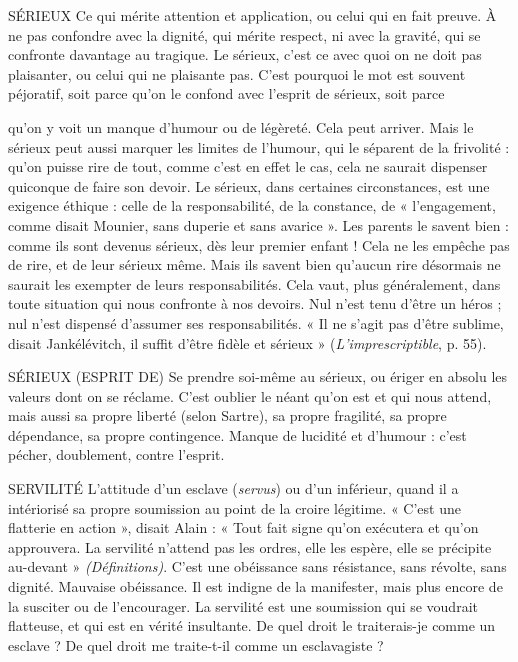 SÉRIEUX Ce qui mérite attention et application, ou celui qui en fait preuve.
À ne pas confondre avec la dignité, qui mérite respect, ni avec la
gravité, qui se confronte davantage au tragique. Le sérieux, c'est ce avec quoi on
ne doit pas plaisanter, ou celui qui ne plaisante pas. C’est pourquoi le mot est
souvent péjoratif, soit parce qu’on le confond avec l’esprit de sérieux, soit parce

qu'on y voit un manque d’humour ou de légèreté. Cela peut arriver. Mais le
sérieux peut aussi marquer les limites de l'humour, qui le séparent de la
frivolité : qu’on puisse rire de tout, comme c’est en effet le cas, cela ne saurait
dispenser quiconque de faire son devoir. Le sérieux, dans certaines circonstances,
est une exigence éthique : celle de la responsabilité, de la constance, de
« l'engagement, comme disait Mounier, sans duperie et sans avarice ». Les
parents le savent bien : comme ils sont devenus sérieux, dès leur premier
enfant ! Cela ne les empêche pas de rire, et de leur sérieux même. Mais ils
savent bien qu’aucun rire désormais ne saurait les exempter de leurs responsabilités.
Cela vaut, plus généralement, dans toute situation qui nous confronte à
nos devoirs. Nul n’est tenu d’être un héros ; nul n’est dispensé d’assumer ses
responsabilités. « Il ne s’agit pas d’être sublime, disait Jankélévitch, il suffit
d’être fidèle et sérieux » ({\it L'imprescriptible}, p. 55).

SÉRIEUX (ESPRIT DE) Se prendre soi-même au sérieux, ou ériger en
absolu les valeurs dont on se réclame. C’est
oublier le néant qu’on est et qui nous attend, mais aussi sa propre liberté (selon
Sartre), sa propre fragilité, sa propre dépendance, sa propre contingence.
Manque de lucidité et d'humour : c’est pécher, doublement, contre l'esprit.

SERVILITÉ L’attitude d’un esclave ({\it servus}) ou d’un inférieur, quand il a
intériorisé sa propre soumission au point de la croire légitime.
« C’est une flatterie en action », disait Alain : « Tout fait signe qu’on exécutera
et qu'on approuvera. La servilité n'attend pas les ordres, elle les espère, elle se
précipite au-devant » {\it (Définitions)}. C’est une obéissance sans résistance, sans
révolte, sans dignité. Mauvaise obéissance. Il est indigne de la manifester, mais
plus encore de la susciter ou de l’encourager. La servilité est une soumission qui
se voudrait flatteuse, et qui est en vérité insultante. De quel droit le traiterais-je
comme un esclave ? De quel droit me traite-t-il comme un esclavagiste ?

